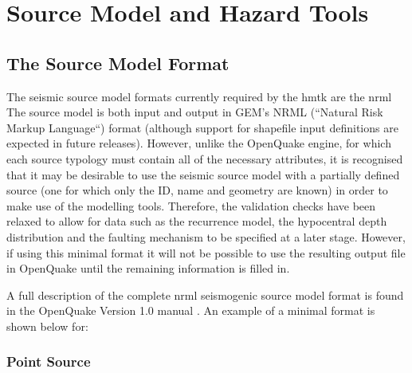 \section{Source Model and Hazard Tools}

\subsection{The Source Model Format}

The seismic source model formats currently required by the hmtk are the nrml  The source model is both input and output in GEM's NRML (``Natural Risk Markup Language``) format (although support for shapefile input definitions are expected in future releases). However, unlike the OpenQuake engine, for which each source typology must contain all of the necessary attributes, it is recognised that it may be desirable to use the seismic source model with a partially defined source (one for which only the ID, name and geometry are known) in order to make use of the modelling tools. Therefore, the validation checks have been relaxed to allow for data such as the recurrence model, the hypocentral depth distribution and the faulting mechanism to be specified at a later stage. However, if using this minimal format it will not be possible to use the resulting output file in OpenQuake until the remaining information is filled in.  

A full description of the complete nrml seismogenic source model format is found in the OpenQuake Version 1.0 manual \cite{crowley2010}. An example of a minimal format is shown below for:

\subsubsection{Point Source}

